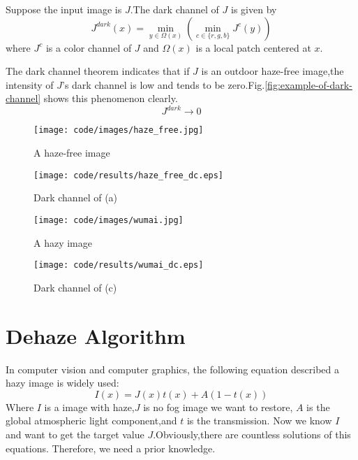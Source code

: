 \documentclass[journal,comsoc]{IEEEtran}
\begin{document}
Suppose the input image is $J$.The dark channel of $J$ is given by
\begin{equation}
  \label{eq:dark-channel-prior}
  J^{dark}(x)=\min_{y\in{\Omega(x)}}(\min_{c\in{\{r,g,b\}}}J^c(y))
\end{equation}
where $J^c$ is a color channel of $J$ and $\Omega(x)$ is a local patch centered at $x$.

The dark channel theorem indicates that if $J$ is an outdoor haze-free image,the intensity of $J$'s dark channel
is low and tends to be zero.Fig.\ref{fig:example-of-dark-channel} shows this phenomenon clearly.
\begin{equation}
  \label{eq:dark-channel-tends-to-be-zero}
  J^{dark}\rightarrow0
\end{equation}
\begin{figure*}[!htb]
  \centering
  \begin{subfigure}{0.5\textwidth}
    \centering
    \texttt{[image: code/images/haze\_free.jpg]}
    \caption{A haze-free image}
    \label{subfig:a-haze-free-image}
  \end{subfigure}%
  \begin{subfigure}{0.5\textwidth}
    \centering
    \texttt{[image: code/results/haze\_free\_dc.eps]}
    \caption{Dark channel of (a)}
    \label{subfig:dark-channel-of-c}
  \end{subfigure}

  \begin{subfigure}{.5\textwidth}
    \centering
    \texttt{[image: code/images/wumai.jpg]}
    \caption{A hazy image}
    \label{subfig:a-hazy-image}
  \end{subfigure}%
  \begin{subfigure}{.5\textwidth}
    \centering
    \texttt{[image: code/results/wumai\_dc.eps]}
    \caption{Dark channel of (c)}
    \label{subfig:dark-channel-of-a}
  \end{subfigure}

  \caption{Examples of dark channel of hazy-free and haze images}
  \label{fig:example-of-dark-channel}
\end{figure*}

\section{Dehaze Algorithm}
\label{sec:dehaze-algorithm}

In computer vision and computer graphics, the following equation described a hazy image is widely used:
\begin{equation}
  \label{eq:hazy-image-model}
  I(x)=J(x)t(x)+A(1-t(x))
\end{equation}
Where $I$ is a image with haze,$J$ is no fog image we want to restore, $A$ is the global atmospheric light component,and $t$ is
the transmission. Now we know $I$ and want to get the target value $J$.Obviously,there are countless solutions of this equations.
Therefore, we need a prior knowledge.
\end{document}
